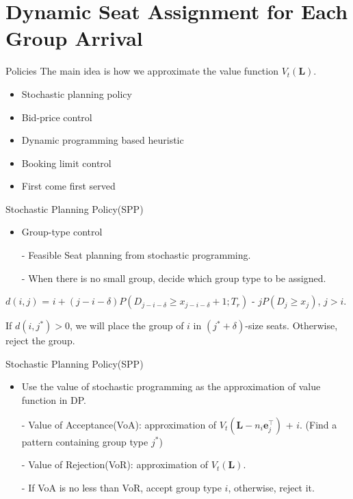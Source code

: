 
\section{Dynamic Seat Assignment for Each Group Arrival}
    \frame{\sectionpage}
    \begin{frame}{Policies}
      The main idea is how we approximate the value function $V_t(\mathbf{L})$.
      \begin{itemize}
        \item Stochastic planning policy
        \item Bid-price control
        \item Dynamic programming based heuristic
        \item Booking limit control
        \item First come first served
      \end{itemize}
    \end{frame}

    \begin{frame}{Stochastic Planning Policy(SPP)}
      \begin{itemize}
        \item Group-type control
        \item[-] Feasible Seat planning from stochastic programming.
        \item[-] When there is no small group, decide which group type to be assigned.
      \end{itemize}
      \vspace*{1cm}
      $d(i, j)$ = $i + (j-i-\delta)P(D_{j-i-\delta} \geq x_{j-i-\delta}+1; T_r)$ - $j P(D_{j} \geq x_{j})$, $j > i$.
      \vspace*{1cm}

      If $d(i, j^{*}) > 0$, we will place the group of $i$ in $(j^{*} + \delta)$-size seats. Otherwise, reject the group.
    \end{frame}

    \begin{frame}{Stochastic Planning Policy(SPP)}
      \begin{itemize}
        \item Use the value of stochastic programming as the approximation of value function in DP.

        \item[-] Value of Acceptance(VoA): approximation of $V_{t} (\mathbf{L}-n_i \mathbf{e}_{j}^{\top})$ + $i$. (Find a pattern containing group type $j^{*}$)
        
        \item[-] Value of Rejection(VoR): approximation of $V_{t} (\mathbf{L})$.

        \item[-] If VoA is no less than VoR, accept group type $i$, otherwise, reject it.
      \end{itemize}
    \end{frame}

